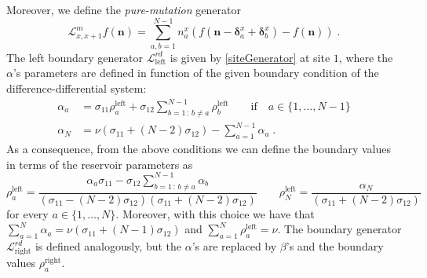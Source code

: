 \documentclass[10pt]{article}
\numberwithin{equation}{section}
\numberwithin{equation}{subsection}
\newtheorem{remark}{Remark}
\newcommand{\dt}{\;.}
\begin{document}
Moreover, we define the \textit{pure-mutation} generator
\begin{equation}
	\mathcal{L}_{x,x+1}^{m}f(\bm{n})=\sum_{a,b=1}^{N-1}n_{a}^{x}\left(f(\bm{n}-\bm{\delta}_{a}^{x}+\bm{\delta}_{b}^{x})-f(\bm{n})\right)\dt
\end{equation}
The left boundary generator $\mathcal{L}_{\text{left}}^{rd}$ is given by \eqref{siteGenerator} at site $1$,
where the $\alpha$'s parameters are defined in function of the given boundary condition of the difference-differential system:
\begin{align}\label{boundaryParamRD}
		\alpha_{a}&=\sigma_{11}\rho_{a}^{\text{left}}+\sigma_{12}\sum_{b=1\,:\,b\neq a}^{N-1}\rho_{b}^{\text{left}}\qquad \text{if} \quad a\in \{1,\ldots,N-1\}\nonumber\\
		\alpha_{N}&=\nu\left(\sigma_{11}+(N-2)\sigma_{12}\right)-\sum_{a=1}^{N-1}\alpha_{a}\dt
\end{align}
As a consequence, from the above conditions we can define the boundary values in terms of the reservoir parameters as
\begin{equation}
	\rho_{a}^{\text{left}}=\frac{\alpha_{a}\sigma_{11}-\sigma_{12}\sum_{b=1\,:\,b\neq a}^{N-1}\alpha_{b}}{(\sigma_{11}-(N-2)\sigma_{12})(\sigma_{11}+(N-2)\sigma_{12})}\qquad \rho_{N}^{\text{left}}=\frac{\alpha_{N}}{(\sigma_{11}+(N-2)\sigma_{12})}
\end{equation}
for every $a\in\{1,\ldots,N\}$. Moreover, with this choice we have that $\sum_{a=1}^{N}\alpha_{a}=\nu(\sigma_{11}+(N-1)\sigma_{12})$ and $\sum_{a=1}^{N}\rho_{a}^{\text{left}}=\nu$. 
The boundary generator $\mathcal{L}_{\text{right}}^{rd}$ is defined analogously, but the $\alpha$'s are replaced by $\beta$'s and the boundary values $\rho_{a}^{\text{right}}$.
\end{document}
